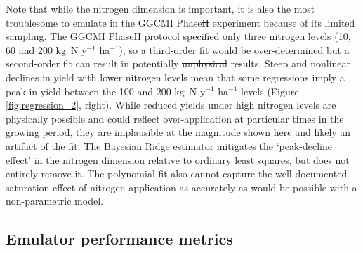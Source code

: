 \documentclass[gmdd]{copernicus} %
\providecommand{\DIFadd}[1]{{\protect\color{blue}\uwave{#1}}} %
\providecommand{\DIFdel}[1]{{\protect\color{red}\sout{#1}}}                      %
\providecommand{\DIFaddbegin}{} %
\providecommand{\DIFaddend}{} %
\providecommand{\DIFdelbegin}{} %
\providecommand{\DIFdelend}{} %
\begin{document}
Note that while the nitrogen dimension is important, it is also the most troublesome to emulate in the GGCMI Phase\DIFdelbegin \DIFdel{II }\DIFdelend \DIFaddbegin \DIFadd{~2 }\DIFaddend experiment because of its limited sampling. 
The GGCMI Phase\DIFdelbegin \DIFdel{II }\DIFdelend \DIFaddbegin \DIFadd{~2 }\DIFaddend protocol specified only three nitrogen levels (10, 60 and 200 kg~N y$^{-1}$ ha$^{-1}$), so a third-order fit would be over-determined but a second-order fit can result in potentially \DIFdelbegin \DIFdel{unphysical }\DIFdelend \DIFaddbegin \DIFadd{non-physical }\DIFaddend results. 
Steep and nonlinear declines in yield with lower nitrogen levels mean that some regressions imply a peak in yield between the 100 and 200 kg~N y$^{-1}$ ha$^{-1}$ levels (Figure \ref{fig:regression_2}, right). 
While reduced yields under high nitrogen levels are physically possible and could reflect over-application at particular times in the growing period, they are implausible at the magnitude shown here and likely an artifact of the fit. 
The Bayesian Ridge estimator mitigates the `peak-decline effect' in the nitrogen dimension relative to ordinary least squares, but does not entirely remove it. 
The polynomial fit also cannot capture the well-documented saturation effect of nitrogen application \citep[e.g.][]{Torsten77} as accurately as would be possible with a non-parametric model. 

\subsection{Emulator performance metrics}
\label{S:4.2}
\DIFaddbegin 
\end{document}
